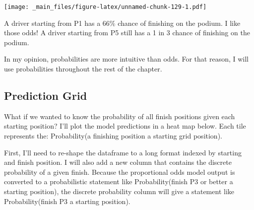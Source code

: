 \documentclass[
]{book}
\begin{document}
\texttt{[image: \_main\_files/figure-latex/unnamed-chunk-129-1.pdf]}

A driver starting from P1 has a 66\% chance of finishing on the podium. I like those odds! A driver starting from P5 still has a 1 in 3 chance of finishing on the podium.

In my opinion, probabilities are more intuitive than odds. For that reason, I will use probabilities throughout the rest of the chapter.

\hypertarget{prediction-grid}{%
\subsection{Prediction Grid}\label{prediction-grid}}

What if we wanted to know the probability of all finish positions given each starting position? I'll plot the model predictions in a heat map below. Each tile represents the: Probability(a finishing position \textbar{} a starting grid position).

First, I'll need to re-shape the dataframe to a long format indexed by starting and finish position. I will also add a new column that contains the discrete probability of a given finish. Because the proportional odds model output is converted to a probabilistic statement like Probability(finish P3 or better \textbar{} a starting position), the discrete probability column will give a statement like Probability(finish P3 \textbar{} a starting position).
\end{document}
